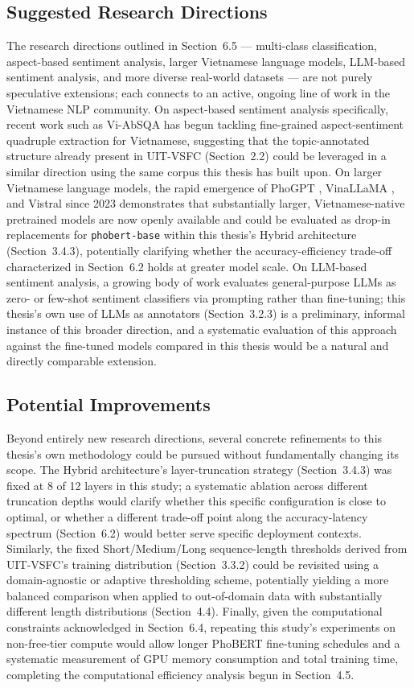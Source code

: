 \documentclass[12pt]{report} %
\begin{document}
\subsection{Suggested Research Directions}
The research directions outlined in Section~6.5 --- multi-class classification, aspect-based sentiment analysis, larger Vietnamese language models, LLM-based sentiment analysis, and more diverse real-world datasets --- are not purely speculative extensions; each connects to an active, ongoing line of work in the Vietnamese NLP community. On aspect-based sentiment analysis specifically, recent work such as Vi-AbSQA \cite{viabsqa2024} has begun tackling fine-grained aspect-sentiment quadruple extraction for Vietnamese, suggesting that the topic-annotated structure already present in UIT-VSFC (Section~2.2) could be leveraged in a similar direction using the same corpus this thesis has built upon. On larger Vietnamese language models, the rapid emergence of PhoGPT \cite{nguyen2023phogpt}, VinaLLaMA \cite{nguyen2023vinallama}, and Vistral \cite{nguyen2023vistral} since 2023 demonstrates that substantially larger, Vietnamese-native pretrained models are now openly available and could be evaluated as drop-in replacements for \texttt{phobert-base} within this thesis's Hybrid architecture (Section~3.4.3), potentially clarifying whether the accuracy-efficiency trade-off characterized in Section~6.2 holds at greater model scale. On LLM-based sentiment analysis, a growing body of work evaluates general-purpose LLMs as zero- or few-shot sentiment classifiers via prompting rather than fine-tuning; this thesis's own use of LLMs as annotators (Section~3.2.3) is a preliminary, informal instance of this broader direction, and a systematic evaluation of this approach against the fine-tuned models compared in this thesis would be a natural and directly comparable extension.

\subsection{Potential Improvements}
Beyond entirely new research directions, several concrete refinements to this thesis's own methodology could be pursued without fundamentally changing its scope. The Hybrid architecture's layer-truncation strategy (Section~3.4.3) was fixed at 8 of 12 layers in this study; a systematic ablation across different truncation depths would clarify whether this specific configuration is close to optimal, or whether a different trade-off point along the accuracy-latency spectrum (Section~6.2) would better serve specific deployment contexts. Similarly, the fixed Short/Medium/Long sequence-length thresholds derived from UIT-VSFC's training distribution (Section~3.3.2) could be revisited using a domain-agnostic or adaptive thresholding scheme, potentially yielding a more balanced comparison when applied to out-of-domain data with substantially different length distributions (Section~4.4). Finally, given the computational constraints acknowledged in Section~6.4, repeating this study's experiments on non-free-tier compute would allow longer PhoBERT fine-tuning schedules and a systematic measurement of GPU memory consumption and total training time, completing the computational efficiency analysis begun in Section~4.5.
\end{document}
